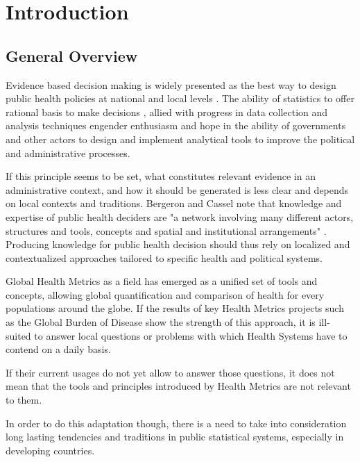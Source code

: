 \section{Introduction}

\subsection{General Overview}

Evidence based decision making is widely presented as the best way to design public health policies at national and local levels \citep{abou-zahr_health_2005,shibuya_health_2005,bambas_nolen_strengthening_2005,mutemwa_hmis_2006,boerma_public_2013}.
The ability of statistics to offer rational basis to make decisions \citep{desrosieres_politique_1993,porter_trust_1996},
allied with progress in data collection and analysis techniques engender enthusiasm and hope in the ability of governments and other actors to design and implement analytical tools to improve the political and administrative processes.

If this principle seems to be set, what constitutes relevant evidence in an administrative context, and how it should be generated is less clear and depends on local contexts and traditions. Bergeron and Cassel note that knowledge and expertise of public health deciders are "a network involving many different actors, structures and tools, concepts and spatial and institutional arrangements" \citep{bergeron_savoirs_2014}. Producing knowledge for public health decision should thus rely on localized and contextualized approaches tailored to specific health and political systems.

Global Health Metrics as a field has emerged as a unified set of tools and concepts, allowing global quantification and comparison of health for every populations around the globe. %
If the results of key Health Metrics projects such as the Global Burden of Disease %
show the strength of this approach, it is ill-suited to answer local questions or problems with which Health Systems have to contend on a daily basis. %

If their current usages do not yet allow to answer those questions, it does not mean that the tools and principles introduced by Health Metrics are not relevant to them. %


In order to do this adaptation though, there is a need to take into consideration long lasting tendencies and traditions in public statistical systems, especially in developing countries.

